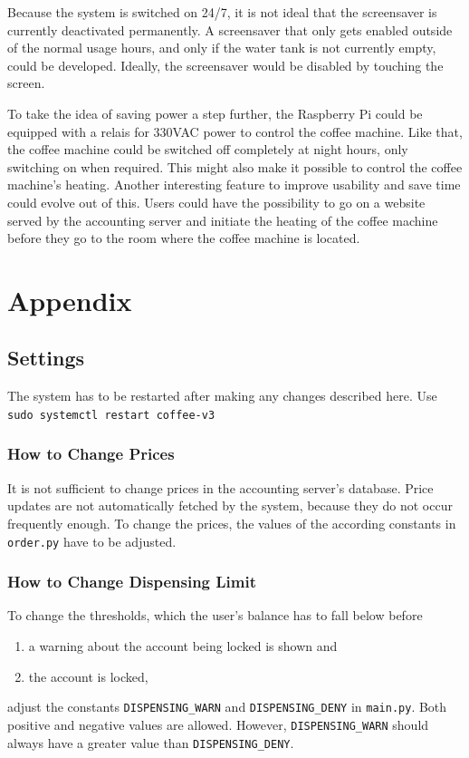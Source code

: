 \documentclass[12pt]{article}
\begin{document}
Because the system is switched on 24/7,
it is not ideal that the screensaver is currently deactivated permanently.
A screensaver that only gets enabled outside of the normal usage hours,
and only if the water tank is not currently empty, could be developed.
Ideally, the screensaver would be disabled by touching the screen.

To take the idea of saving power a step further,
the Raspberry Pi could be equipped with a relais for 330VAC power to control the coffee machine. 
Like that, the coffee machine could be switched off completely at night hours,
only switching on when required. This might also make it possible to control the coffee machine's heating.
Another interesting feature to improve usability and save time could evolve out of this.
Users could have the possibility to go on a website served by the accounting server and initiate the heating of the coffee machine
before they go to the room where the coffee machine is located.

\pagebreak
\begingroup
\pagestyle{empty}
\null
\newpage
\endgroup




\pagebreak
\clearpage
\begingroup
\pagestyle{empty}
\null
\newpage
\endgroup

\appendix
\section{Appendix}
\subsection{Settings}
The system has to be restarted after making any changes described here.
Use \texttt{sudo systemctl restart coffee-v3}
\subsubsection{How to Change Prices}
It is not sufficient to change prices in the accounting server's database.
Price updates are not automatically fetched by the system, because they do not occur frequently enough.
To change the prices, the values of the according constants in \texttt{order.py} have to be adjusted.

\subsubsection{How to Change Dispensing Limit}
\label{app:dispensing}
To change the thresholds, which the user's balance has to fall below before 
\begin{enumerate}
  \item a warning about the account being locked is shown and 
  \item the account is locked,
\end{enumerate}
adjust the constants \texttt{DISPENSING\_WARN} and \texttt{DISPENSING\_DENY} in \texttt{main.py}.
Both positive and negative values are allowed.
However, \texttt{DISPENSING\_WARN} should always have a greater value than \texttt{DISPENSING\_DENY}.
\end{document}
